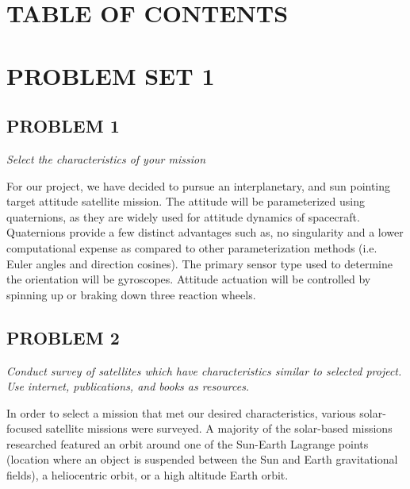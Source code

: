 \documentclass[12pt,a4paper,notitlepage]{article}
\begin{document}
\newpage
\section*{\Large TABLE OF CONTENTS}
\makeatletter
{}
\makeatother
\newpage


\section{\Large PROBLEM SET 1}
\subsection{PROBLEM 1}
\textit{Select the characteristics of your mission}

For our project, we have decided to pursue an interplanetary, and sun pointing target attitude satellite mission. The attitude will be parameterized using quaternions, as they are widely used for attitude dynamics of spacecraft. Quaternions provide a few distinct advantages such as, no singularity and a lower computational expense as compared to other parameterization methods (i.e. Euler angles and direction cosines). The primary sensor type used to determine the orientation will be gyroscopes. Attitude actuation will be controlled by spinning up or braking down three reaction wheels.

\subsection{PROBLEM 2}
\textit{Conduct survey of satellites which have characteristics similar to selected project. Use internet,
publications, and books as resources.}

In order to select a mission that met our desired characteristics, various solar-focused satellite missions were surveyed. A majority of the solar-based missions researched featured an orbit around one of the Sun-Earth Lagrange points (location where an object is suspended between the Sun and Earth gravitational fields), a heliocentric orbit, or a high altitude Earth orbit.
\end{document}
